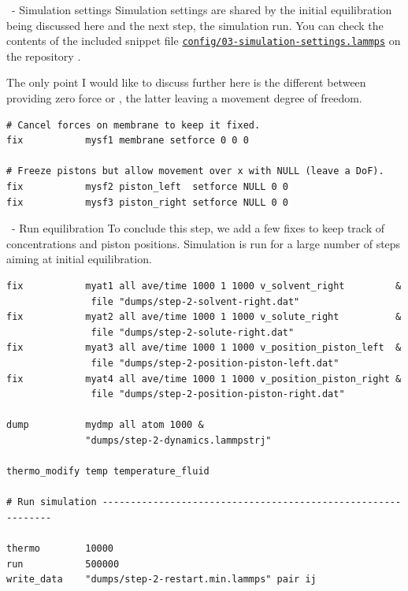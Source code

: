 \begin{frame}[fragile]{\secname}{\subsecname\ - Simulation settings}
Simulation settings are shared by the initial equilibration being discussed here and the next step, the simulation run. You can check the contents of the included snippet file \href{https://github.com/WallyTutor/learning-scientific-computing/blob/main/molecular-dynamics/lammps/tutorials-simon-gravelle/02-Permeable-Membrane/config/03-simulation-settings.lammps}{\Verb|config/03-simulation-settings.lammps|} on the repository .

\vspace{0.5cm}

The only point I would like to discuss further here is the different between providing zero force or , the latter leaving a movement degree of freedom.

\vspace{0.5cm}

\begin{lstlisting}[language=LAMMPS,basicstyle=\tiny]
# Cancel forces on membrane to keep it fixed.
fix           mysf1 membrane setforce 0 0 0

# Freeze pistons but allow movement over x with NULL (leave a DoF).
fix           mysf2 piston_left  setforce NULL 0 0
fix           mysf3 piston_right setforce NULL 0 0
\end{lstlisting}
\end{frame}

\begin{frame}[fragile]{\secname}{\subsecname\ - Run equilibration}
To conclude this step, we add a few fixes to keep track of concentrations and piston positions. Simulation is run for a large number of steps aiming at initial equilibration.

\vspace{0.5cm}

\begin{lstlisting}[language=LAMMPS,basicstyle=\tiny]
fix           myat1 all ave/time 1000 1 1000 v_solvent_right         &
               file "dumps/step-2-solvent-right.dat"
fix           myat2 all ave/time 1000 1 1000 v_solute_right          &
               file "dumps/step-2-solute-right.dat"
fix           myat3 all ave/time 1000 1 1000 v_position_piston_left  &
               file "dumps/step-2-position-piston-left.dat"
fix           myat4 all ave/time 1000 1 1000 v_position_piston_right &
               file "dumps/step-2-position-piston-right.dat"

dump          mydmp all atom 1000 &
              "dumps/step-2-dynamics.lammpstrj"

thermo_modify temp temperature_fluid

# Run simulation -------------------------------------------------------------

thermo        10000
run           500000
write_data    "dumps/step-2-restart.min.lammps" pair ij
\end{lstlisting}
\end{frame}


